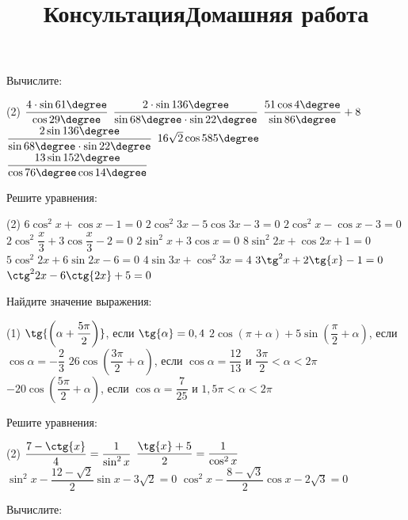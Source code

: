 \begin{consultation}
	\title{Консультация}
	\begin{listofex}
		\item Вычислите:
		\begin{tasks}(2)
			\task \(\dfrac{4 \cdot \sin61\degree}{\cos29\degree}\)
			\task \(\dfrac{2 \cdot \sin136\degree}{\sin68\degree \cdot \sin22\degree}\)
			\task \( \dfrac{51\cos{4\degree}}{\sin{86\degree}}+8 \)
			\task \( \dfrac{2\sin{136\degree}}{\sin{68\degree}\cdot \sin{22\degree}} \)
			\task \( 16\sqrt{2}\cos{585\degree} \)
			\task \( \dfrac{13\sin{152\degree}}{\cos{76\degree}\cos{14\degree}} \)
		\end{tasks}
		\item Решите уравнения:
		\begin{tasks}(2)
			\task \( 6\cos^2{x}+\cos{x}-1=0 \)
			\task \( 2\cos^2{3x}-5\cos{3x}-3=0 \)
			\task \( 2\cos^2x-\cos{x}-3=0 \)
			\task \( 2\cos^2{\dfrac{x}{3}}+3\cos{\dfrac{x}{3}}-2=0 \)
			\task \( 2\sin^2x+3\cos{x}=0 \)
			\task \( 8\sin^2{2x}+\cos{2x}+1=0 \)
			\task \( 5\cos^2{2x}+6\sin{2x}-6=0 \)
			\task \( 4\sin{3x}+\cos^2{3x}=4 \)
			\task \( 3\tg^2{x}+2\tg{x}-1=0 \)
			\task \( \ctg^2{2x}-6\ctg{2x}+5=0 \)
		\end{tasks}
		\item Найдите значение выражения:
		\begin{tasks}(1)
			\task \( \tg{\left( \alpha+\dfrac{5\pi}{2}\right)} \), если \( \tg{\alpha}=0,4 \)
			\task \( 2\cos{(\pi+\alpha)} +5 \sin{\left(\dfrac{\pi}{2}+\alpha\right)} \), если \( \cos{\alpha}=-\dfrac{2}{3} \)
			\task \( 26\cos{\left( \dfrac{3\pi}{2}+\alpha \right)} \), если \( \cos{\alpha}=\dfrac{12}{13} \) и \( \dfrac{3\pi}{2}< \alpha< 2\pi \)
			\task \( -20\cos{\left( \dfrac{5\pi}{2}+\alpha \right)} \), если \( \cos{\alpha}=\dfrac{7}{25} \) и \( 1,5\pi<\alpha<2\pi \)
		\end{tasks}
		\item Решите уравнения:
		\begin{tasks}(2)
			\task \( \dfrac{7-\ctg{x}}{4}=\dfrac{1}{\sin^2{x}} \)
			\task \( \dfrac{\tg{x}+5}{2}=\dfrac{1}{\cos^2{x}} \)
			\task \( \sin^2{x}-\dfrac{12-\sqrt{2}}{2}\sin{x}-3\sqrt{2}=0 \)
			\task \( \cos^2{x}-\dfrac{8-\sqrt{3}}{2}\cos{x}-2\sqrt{3}=0 \)
		\end{tasks}
	\end{listofex}
	\newpage
	\title{Домашняя работа}
		\begin{listofex}
			\item Вычислите:

\end{listofex}
\end{consultation}

